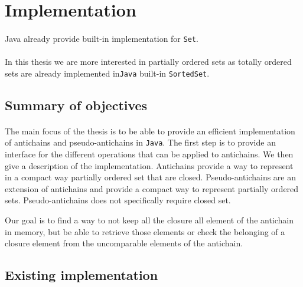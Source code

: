 \documentclass[letterpaper]{article}
\theoremstyle{definition}
\begin{document}
\section{Implementation}

\paragraph{}

Java already provide built-in implementation for \texttt{Set}.

\paragraph{}

In this thesis we are more interested in partially ordered sets as
totally ordered sets are already implemented
in\texttt{Java} built-in
\texttt{SortedSet}.

\subsection{Summary of objectives}


\paragraph{}


The main focus of the thesis is to be able to provide an efficient
implementation of antichains and pseudo-antichains in \texttt{Java}.
The first step is to provide an interface for the different operations that
can be applied to antichains. We then give a description
of the implementation.
Antichains provide a way to represent
in a compact way partially ordered set that are closed. Pseudo-antichains
are an extension of antichains and provide a compact way to represent
partially ordered sets. Pseudo-antichains does not specifically require
closed set.

Our goal is to find a way to not keep all the closure all
element of the antichain in memory, but be able to retrieve those elements
or check the belonging of a closure element from the uncomparable elements
of the antichain.

\subsection{Existing implementation}
\end{document}
